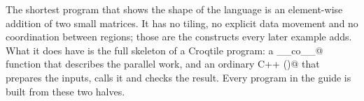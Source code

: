 The shortest program that shows the shape of the language is an element-wise addition of two small matrices. It has no tiling, no explicit data movement and no coordination between regions; those are the constructs every later example adds. What it does have is the full skeleton of a Croqtile program: a \co@__co__@ function that describes the parallel work, and an ordinary C++ \co@main()@ that prepares the inputs, calls it and checks the result. Every program in the guide is built from these two halves.
